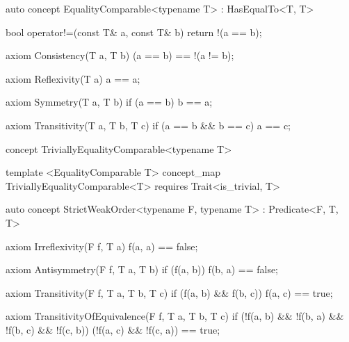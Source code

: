 \documentclass[american,twoside]{book}
\begin{document}
\begin{itemdescr}
\pnum 
{}
\end{itemdescr}

\begin{itemdecl}
auto concept EqualityComparable<typename T> : HasEqualTo<T, T> {
  bool operator!=(const T& a, const T& b) { return !(a == b); }

  axiom Consistency(T a, T b) {
    (a == b) == !(a != b);
  }

  axiom Reflexivity(T a) { a == a; }

  axiom Symmetry(T a, T b) { 
    if (a == b) 
      b == a; 
  }

  axiom Transitivity(T a, T b, T c) {
    if (a == b && b == c) 
      a == c;
  }
}
\end{itemdecl}

\begin{itemdescr}
\pnum
{}
\end{itemdescr}

\begin{itemdecl}
concept TriviallyEqualityComparable<typename T> { }

template <EqualityComparable T>
concept_map TriviallyEqualityComparable<T>
requires Trait<is_trivial, T> 
{ }

\end{itemdecl}

\begin{itemdescr}
\pnum 
{}
\end{itemdescr}

\begin{itemdecl}
auto concept StrictWeakOrder<typename F, typename T> : Predicate<F, T, T> {

  axiom Irreflexivity(F f, T a) { f(a, a) == false; }

  axiom Antisymmetry(F f, T a, T b) { 
    if (f(a, b)) 
      f(b, a) == false;
  }

  axiom Transitivity(F f, T a, T b, T c) {
    if (f(a, b) && f(b, c)) 
      f(a, c) == true;
  }

  axiom TransitivityOfEquivalence(F f, T a, T b, T c) {
    if (!f(a, b) && !f(b, a) && !f(b, c) && !f(c, b))
      (!f(a, c) && !f(c, a)) == true;
  }
}
\end{itemdecl}
\end{document}
